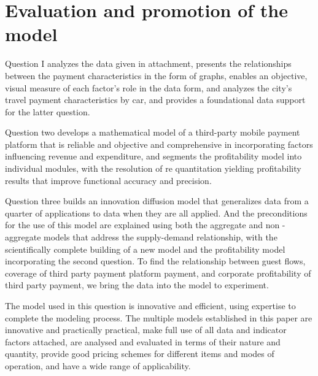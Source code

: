 \documentclass[../mcmpaper]{subfiles}
\begin{document}
	\section{Evaluation and promotion of the model}
	Question I analyzes the data given in attachment, presents the relationships between the payment characteristics in the form of graphs, enables an objective, visual measure of each factor's role in the data form, and analyzes the city's travel payment characteristics by car, and provides a foundational data support for the latter question.
\par
Question two develops a mathematical model of a third-party mobile payment platform that is reliable and objective and comprehensive in incorporating factors influencing revenue and expenditure, and segments the profitability model into individual modules, with the resolution of re quantitation yielding profitability results that improve functional accuracy and precision.
\par
Question three builds an innovation diffusion model that generalizes data from a quarter of applications to data when they are all applied. And the preconditions for the use of this model are explained using both the aggregate and non - aggregate models that address the supply-demand relationship, with the scientifically complete building of a new model and the profitability model incorporating the second question. To find the relationship between guest flows, coverage of third party payment platform payment, and corporate profitability of third party payment, we bring the data into the model to experiment.
\par
The model used in this question is innovative and efficient, using expertise to complete the modeling process. The multiple models established in this paper are innovative and practically practical, make full use of all data and indicator factors attached, are analysed and evaluated in terms of their nature and quantity, provide good pricing schemes for different items and modes of operation, and have a wide range of applicability.
\end{document}

